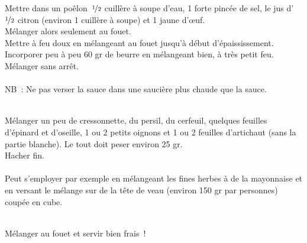 \begin{minipage}[c]{\textwidth}
Mettre dans un poêlon $\nicefrac{1}{2}$ cuillère à soupe d’eau, 1 forte pincée de sel, le jus d’$\nicefrac{1}{2}$ citron (environ 1 cuillère à soupe) et 1 jaune d’œuf. \\
Mélanger alors seulement au fouet.\\
Mettre à feu doux en mélangeant au fouet jusqu’à début d’épaississement.\\
Incorporer peu à peu 60 gr de beurre en mélangeant bien, à très petit feu. \\
Mélanger sans arrêt.\\
\\
NB : Ne pas verser  la sauce dans une saucière plus chaude que la sauce.\\
\\

\end{minipage}

\begin{minipage}[c]{\textwidth}
Mélanger un peu de cressonnette, du persil, du cerfeuil, quelques feuilles d'épinard et d’oseille, 1 ou 2 petits oignons et 1 ou 2 feuilles d’artichaut (sans la partie blanche). Le tout doit peser environ 25 gr.\\
Hacher fin.  \\
\\
Peut s'employer par exemple en mélangeant les fines herbes à de la mayonnaise et en versant le mélange sur de la tête de veau (environ 150 gr par personnes) coupée en cube.\\
\\

\end{minipage}

\begin{minipage}[c]{\textwidth}
Mélanger au fouet et servir bien frais ! \\
\\

\end{minipage}

